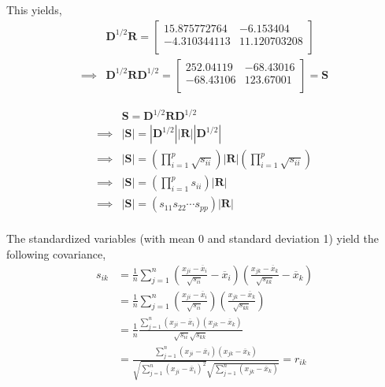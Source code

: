 \documentclass[12pt]{article}
\newenvironment{problem}[2][Problem]{\begin{trivlist}
\item[\hskip \labelsep {\bfseries #1}\hskip \labelsep {\bfseries #2.}]}{\end{trivlist}}
\newcommand{\vct}{\mathbf}
\begin{document}
This yields,
\begin{align*}
&\vct{D}^{1/2}\vct{R} = \begin{bmatrix}
   15.875772764       & -6.153404 \\
    -4.310344113       & 11.120703208 \\
\end{bmatrix}\\
\implies &\vct{D}^{1/2}\vct{R}\vct{D}^{1/2} = \begin{bmatrix}
   252.04119       & -68.43016 \\
    -68.43106      & 123.67001 \\
\end{bmatrix} = \vct{S}
\end{align*}

\begin{problem}{3.12}
\end{problem}

\begin{align*}
&\vct{S} = \vct{D}^{1/2}\vct{R}\vct{D}^{1/2}\\
\implies &|\vct{S}| = |\vct{D}^{1/2}||\vct{R}||\vct{D}^{1/2}|\\
\implies &|\vct{S}| = \left(\prod_{i = 1}^p \sqrt{s_{ii}}\right)|\vct{R}|\left(\prod_{i = 1}^p \sqrt{s_{ii}}\right)\\
\implies &|\vct{S}| = \left(\prod_{i = 1}^p s_{ii}\right)|\vct{R}|\\
\implies &|\vct{S}| = \left(s_{11}s_{22}\cdots s_{pp}\right)|\vct{R}|\\
\end{align*}

\begin{problem}{3.13}
\end{problem}

The standardized variables (with mean 0 and standard deviation 1) yield the following covariance,
\begin{align*}
s_{ik} &= \frac{1}{n} \sum_{j=1}^n \left(\frac{x_{ji} - \overline{x}_i}{\sqrt{s_{ii}}} - \overline{x}_i\right)\left(\frac{x_{jk} - \overline{x}_k}{\sqrt{s_{kk}}} - \overline{x}_k\right)\\
&= \frac{1}{n} \sum_{j=1}^n \left(\frac{x_{ji} - \overline{x}_i}{\sqrt{s_{ii}}}\right)\left(\frac{x_{jk} - \overline{x}_k}{\sqrt{s_{kk}}}\right)\\
&= \frac{1}{n} \frac{\sum_{j=1}^n \left(x_{ji} - \overline{x}_i\right)\left(x_{jk} - \overline{x}_k\right)}{\sqrt{s_{ii}}\sqrt{s_{kk}}}\\
&= \frac{\sum_{j=1}^n \left(x_{ji} - \overline{x}_i\right)\left(x_{jk} - \overline{x}_k\right)}{\sqrt{\sum_{j=1}^n \left(x_{ji} - \overline{x}_i\right)^2}\sqrt{\sum_{j=1}^n \left(x_{jk} - \overline{x}_k\right)}} = r_{ik}
\end{align*}
\end{document}
